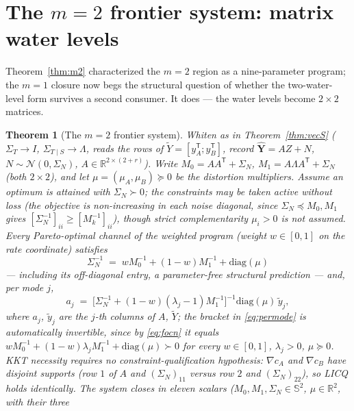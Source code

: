 \documentclass[11pt]{article}
\newtheorem{theorem}{Theorem}\newtheorem{corollary}{Corollary}
\begin{document}
\section{The $m=2$ frontier system: matrix water levels}\label{sec:m2sys}

Theorem~\ref{thm:m2} characterized the $m{=}2$ region as a nine-parameter
program; the $m{=}1$ closure now begs the structural question of whether
the two-water-level form survives a second consumer. It does --- the
water levels become $2\times2$ matrices.

\begin{theorem}[The $m=2$ frontier system]\label{thm:m2sys}
Whiten as in Theorem~\ref{thm:vecS} ($\Sigma_T\to I$,
$\Sigma_{T\mid S}\to\Lambda$, reads the rows of
$\widetilde Y=[y_A^{\mathsf T};y_B^{\mathsf T}]$, record
$\hat{\mathbf Y}=AZ+N$, $N\sim\mathcal N(0,\Sigma_N)$, $A\in\mathbb
R^{2\times(2+r)}$). Write $M_0=AA^{\mathsf T}+\Sigma_N$,
$M_1=A\Lambda A^{\mathsf T}+\Sigma_N$ (both $2\times2$), and let
$\mu=(\mu_A,\mu_B)\succeq0$ be the distortion multipliers. Assume an
optimum is attained with $\Sigma_N\succ0$; the constraints may be taken
active without loss (the objective is non-increasing in each noise
diagonal, since $\Sigma_N\preceq M_0,M_1$ gives
$[\Sigma_N^{-1}]_{ii}\ge[M_k^{-1}]_{ii}$), though strict complementarity
$\mu_i>0$ is \emph{not} assumed. Every
Pareto-optimal channel of the weighted program (weight $w\in[0,1]$ on the
rate coordinate) satisfies
\begin{equation}
\Sigma_N^{-1}\;=\;wM_0^{-1}+(1-w)M_1^{-1}+\mathrm{diag}(\mu)
\label{eq:focn}
\end{equation}
--- including its off-diagonal entry, a parameter-free structural
prediction --- and, \emph{per mode} $j$,
\begin{equation}
a_j\;=\;\bigl[\Sigma_N^{-1}+(1-w)(\lambda_j-1)M_1^{-1}\bigr]^{-1}
\mathrm{diag}(\mu)\,\tilde y_j,
\label{eq:permode}
\end{equation}
where $a_j$, $\tilde y_j$ are the $j$-th columns of $A$, $\widetilde Y$;
the bracket in \eqref{eq:permode} is automatically invertible, since by
\eqref{eq:focn} it equals
$wM_0^{-1}+(1-w)\lambda_jM_1^{-1}+\mathrm{diag}(\mu)\succ0$ for every
$w\in[0,1]$, $\lambda_j>0$, $\mu\succeq0$. KKT necessity requires no
constraint-qualification hypothesis: $\nabla c_A$ and $\nabla c_B$ have
disjoint supports (row $1$ of $A$ and $(\Sigma_N)_{11}$ versus row $2$
and $(\Sigma_N)_{22}$), so LICQ holds identically. The system closes in
eleven scalars
($M_0,M_1,\Sigma_N\in\mathbb S^2$, $\mu\in\mathbb R^2$, with their three

\end{theorem}
\end{document}
